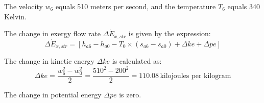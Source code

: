 The velocity \( w_6 \) equals 510 meters per second, and the temperature \( T_6 \) equals 340 Kelvin.

The change in exergy flow rate \( \Delta \dot{E}_{x,str} \) is given by the expression:
\[ \Delta \dot{E}_{x,str} = \left[ h_{a6} - h_{a0} - T_0 \times (s_{a6} - s_{a0}) + \Delta ke + \Delta pe \right] \]

The change in kinetic energy \( \Delta ke \) is calculated as:
\[ \Delta ke = \frac{w_6^2 - w_0^2}{2} = \frac{510^2 - 200^2}{2} = 110.08 \, \text{kilojoules per kilogram} \]

The change in potential energy \( \Delta pe \) is zero.